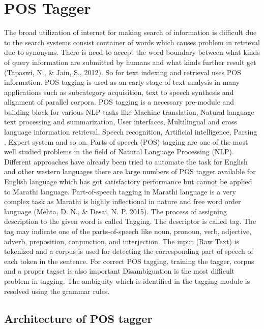 \documentclass[12pt,a4paper,oneside]{memoir}
\begin{document}
\section{POS Tagger}
The broad utilization of internet for making search of information is difficult due to the search systems consist container of words which causes problem in retrieval due to synonyms. There is need to accept the word boundary between what kinds of query information are submitted by humans and what kinds further result get (Tapaswi, N., \& Jain, S., 2012). So for text indexing and retrieval uses POS information. POS tagging is used as an early stage of text analysis in many applications such as subcategory acquisition, text to speech synthesis and alignment of parallel corpora. POS tagging is a necessary pre-module and building block for various NLP tasks like Machine translation, Natural language text processing and summarization, User interfaces, Multilingual and cross language information retrieval, Speech recognition, Artificial intelligence, Parsing , Expert system and so on. Parts of speech (POS) tagging are one of the most well studied problems in the field of Natural Language Processing (NLP). Different approaches have already been tried to automate the task for English and other western languages there are large numbers of POS tagger available for English language which has got satisfactory performance but cannot be applied to Marathi language. Part-of-speech tagging in Marathi language is a very complex task as Marathi is highly inflectional in nature and free word order language (Mehta, D. N., \& Desai, N. P. 2015). The process of assigning description to the given word is called Tagging. The descriptor is called tag. The tag may indicate one of the parts-of-speech like noun, pronoun, verb, adjective, adverb, preposition, conjunction, and interjection. The input (Raw Text) is tokenized and a corpus is used for detecting the corresponding part of speech of each token in the sentence. For correct POS tagging, training the tagger, corpus and a proper tagset is also important Disambiguation is the most difficult problem in tagging. The ambiguity which is identified in the tagging module is resolved using the grammar rules. 


\subsection{Architecture of POS tagger}
\end{document}
